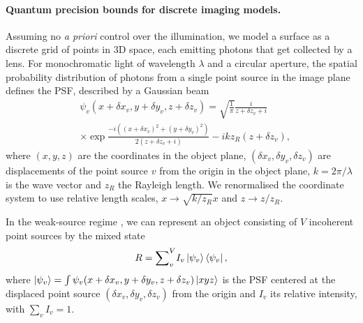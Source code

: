 \documentclass[reprint,amsmath,amssymb,aps,prl,floatfix,groupedaddress,superscriptaddress]{revtex4-2}
\begin{document}
\paragraph{\bfseries Quantum precision bounds for discrete imaging models.\label{sec:CR-bounds} }
Assuming no \textit{a priori} control  over the illumination, we model a surface as a discrete grid of points in 3D space, each emitting photons that get collected by a lens. For monochromatic light of wavelength $\lambda$ and a circular aperture, the spatial probability distribution of photons from a single point source in the image plane defines the PSF, described by a Gaussian beam
\begin{equation}
\begin{aligned}
\label{def:psf}
\!\!    &\psi_v (x+\delta x_v,y+\delta y_v,z+\delta z_v) = \sqrt{\frac{1}{\pi}} \frac{i}{z+\delta z_v + i} \\
\!\!    &\times \exp{\frac{-i((x+\delta x_v)^2 + (y+ \delta y_v)^2)}{2(z+\delta z_v + i)} - ikz_R(z+\delta z_v)},
\end{aligned}
\end{equation}
where $(x,y,z)$ are the coordinates in the object plane, $(\delta x_v,\delta y_v,\delta z_v)$ are displacements of the point source $v$ from the origin in the object plane, $k= 2\pi / \lambda$ is the wave vector and $z_R$ the Rayleigh length. We renormalised the coordinate system to use relative length scales, $x \rightarrow \sqrt{k/z_R}x$ and $ z \rightarrow z/z_R$.

In the weak-source regime \cite{tsang2016quantum}, we can represent an object consisting of $V$ incoherent point sources by the mixed state
\begin{align} \label{eq:incoherent_ensemble}
    R = {\sum}_v^V I_v \ket{\psi_v}\bra{\psi_v},
\end{align}
where $\ket{\psi_v} = \int \psi_v (x+\delta x_v,y+\delta y_v,z+\delta z_v) \ket{xyz}$ is the PSF centered at the displaced point source $(\delta x_v,\delta y_v,\delta z_v)$ from the origin and $I_v$ its relative intensity, with $\sum_v I_v=1$.
\end{document}
